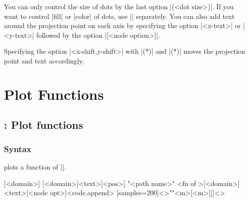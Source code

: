 You can only control the size of dots by the last option |(<dot size>)|.
If you want to control |fill| or |color| of dots, use |\tzdot*| separately.
You can also add text around the projection point on each axis by specifying the option |{<x-text>}| or |{<y-text>}| followed by the option |[<node option>]|.

\begin{tzcode}{.3}
\end{tzcode}

Specifying the option |<x-shift,y-shift>| with |\tzprojx(*)| and |\tzprojy(*)| moves the projection point and text accordingly.

\begin{tzcode}{.3}
\end{tzcode}




\chapter{Plot Functions}
\label{c:functions}


\section{\protect\cmd{\tzfn}: Plot functions}
\label{s:tzfn}

\subsection{Syntax}
\label{ss:tzfn}

\icmd{\tzfn} plots a function of |\x|.

\begin{tzdef}{}
[<domain>]
[<domain>]{<text>}[<pos>]
"<path name>"
     {<fn of \x>}[<domain>]{<text>}[<node opt>]<code.append>
  [samples=200]<>""{<m>}[<m>]{}[]<>
\end{tzdef}

